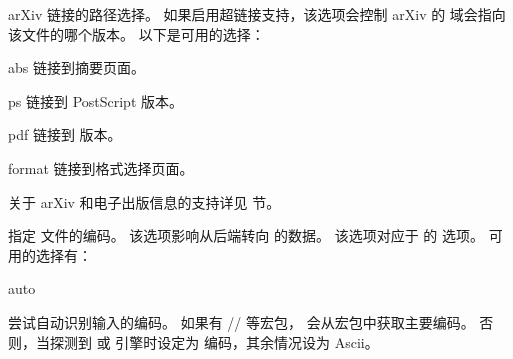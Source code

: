 \begin{optionlist}


arXiv 链接的路径选择。
如果启用超链接支持，该选项会控制 arXiv 的  域会指向该文件的哪个版本。
以下是可用的选择：

\begin{valuelist}
\item[abs] %
链接到摘要页面。
\item[ps] %
链接到 PostScript 版本。
\item[pdf] %
链接到 \pdf 版本。
\item[format] %
链接到格式选择页面。
\end{valuelist}

关于 arXiv 和电子出版信息的支持详见  节。



指定  文件的编码。
该选项影响从后端转向 \biblatex  的数据。
该选项对应于 \biber 的  选项。
可用的选择有：

\begin{valuelist}

\item[auto] %

尝试自动识别输入的编码。
如果有 \slash{}\slash{} 等宏包，
\biblatex 会从宏包中获取主要编码。
否则，当探测到 \XeTeX 或 \LuaTeX 引擎时设定为 \utf 编码，其余情况设为 Ascii。

\item[\prm{encoding}] %


\end{valuelist}
\end{optionlist}
